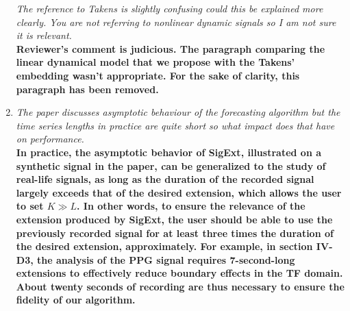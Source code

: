 \documentclass[11pt,DIV=16]{scrartcl}
\begin{document}
\begin{enumerate}[1)]
\textit{The reference to Takens is slightly confusing could this be explained more clearly. You are not referring to nonlinear dynamic signals so I am not sure it is relevant.} \\
\textbf{Reviewer's comment is judicious. The paragraph comparing the linear dynamical model that we propose with the Takens' embedding wasn't appropriate. For the sake of clarity, this paragraph has been removed.}
\item
\textit{The paper discusses asymptotic behaviour of the forecasting algorithm but the time series lengths in practice are quite short so what impact does that have on performance.} \\
\textbf{In practice, the asymptotic behavior of \textsf{SigExt}, illustrated on a synthetic signal in the paper, can be generalized to the study of real-life signals, as long as the duration of the recorded signal largely exceeds that of the desired extension, which allows the user to set $K \gg L$. In other words, to ensure the relevance of the extension produced by \textsf{SigExt}, the user should be able to use the previously recorded signal for at least three times the duration of the desired extension, approximately. For example, in section IV-D3, the analysis of the PPG signal requires 7-second-long extensions to effectively reduce boundary effects in the TF domain. About twenty seconds of recording are thus necessary to ensure the fidelity of our algorithm.}
\end{enumerate}
\end{document}
